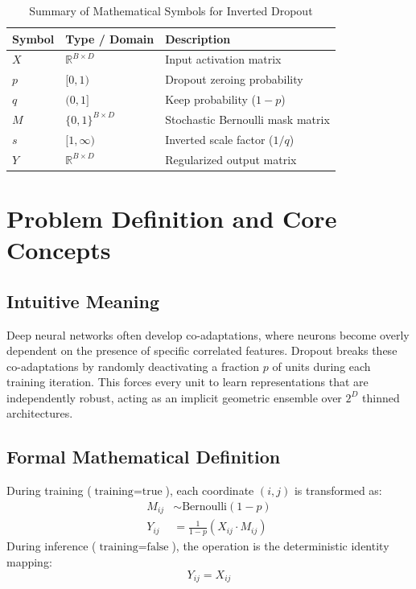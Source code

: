 \documentclass[11pt,a4paper]{article}
\theoremstyle{definition}
\begin{document}
\begin{table}[h]
\centering
\caption{Summary of Mathematical Symbols for Inverted Dropout}
\begin{tabular}{lll}
\toprule
\textbf{Symbol} & \textbf{Type / Domain} & \textbf{Description} \\
\midrule
$X$ & $\mathbb{R}^{B \times D}$ & Input activation matrix \\
$p$ & $[0, 1)$ & Dropout zeroing probability \\
$q$ & $(0, 1]$ & Keep probability ($1 - p$) \\
$M$ & $\{0, 1\}^{B \times D}$ & Stochastic Bernoulli mask matrix \\
$s$ & $[1, \infty)$ & Inverted scale factor ($1/q$) \\
$Y$ & $\mathbb{R}^{B \times D}$ & Regularized output matrix \\
\bottomrule
\end{tabular}
\end{table}

\section{Problem Definition and Core Concepts}

\subsection{Intuitive Meaning}
Deep neural networks often develop co-adaptations, where neurons become overly dependent on the presence of specific correlated features. Dropout breaks these co-adaptations by randomly deactivating a fraction $p$ of units during each training iteration. This forces every unit to learn representations that are independently robust, acting as an implicit geometric ensemble over $2^D$ thinned architectures.

\subsection{Formal Mathematical Definition}
During training ($\text{training} = \text{true}$), each coordinate $(i, j)$ is transformed as:
\begin{align}
M_{ij} &\sim \text{Bernoulli}(1 - p) \\
Y_{ij} &= \frac{1}{1 - p} (X_{ij} \cdot M_{ij})
\end{align}
During inference ($\text{training} = \text{false}$), the operation is the deterministic identity mapping:
\begin{equation}
Y_{ij} = X_{ij}
\end{equation}
\end{document}

